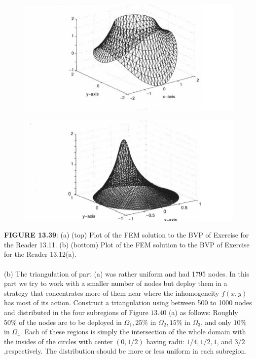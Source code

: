 \documentclass[../main.tex]{subfiles}
\begin{document}
\begin{figure}[H]
\includegraphics[width=0.9\linewidth]{24}
	\centering
	\label{pfig:ch13_24}
\end{figure}
	\begin{figure}[H]
\includegraphics[width=0.9\linewidth]{25}
	\centering
	\label{pfig:ch13_25}
\end{figure}
\textbf{FIGURE 13.39}: (a) (top) Plot of the FEM solution to the BVP of Exercise for the Reader 
13.11. (b) (bottom) Plot of the FEM solution to the BVP of Exercise for the Reader 
13.12(a).
\\
\\
(b) The triangulation of part (a) was rather uniform and had 1795 nodes. In this part we try to work with a smaller number of nodes but deploy them in a strategy that concentrates more of them near where the inhomogeneity $f(x, y)$ has most of its action. Construct a triangulation using between 500 to 1000 nodes and distributed in the four subregions of Figure $13.40$ (a) as follows: Roughly $50 \%$ of the nodes are to be deployed in $\Omega_{1}, 25 \%$ in $\Omega_{2}, 15 \%$ in $\Omega_{3}$, and only $10 \%$ in $\Omega_{4}$. Each of these regions is simply the intersection of the whole domain with the insides of the circles with center $(0,1 / 2)$ having radii: $1 / 4,1 / 2,1$, and $3 / 2$,respectively. The distribution should be more or less uniform in each subregion. 
\end{document}
